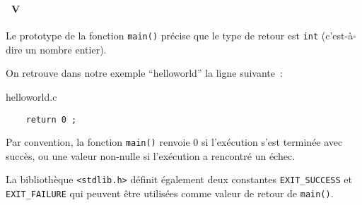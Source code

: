 \begin{frame}[containsverbatim]
  \frametitle{\secname}
  \framesubtitle{\subsecname~V}

  \par
  Le prototype de la fonction \verb|main()| précise que le type de retour est \verb|int| (c'est-à-dire un nombre entier). 
  \par
  On retrouve dans notre exemple ``helloworld'' la ligne suivante~:
  \begin{exampleblock}{helloworld.c}
    \begin{verbatim}
    return 0 ; 
    \end{verbatim}
  \end{exampleblock}
  \par
  Par convention, la fonction \verb|main()| renvoie 0 si l'exécution s'est terminée avec succès, ou une valeur non-nulle si l'exécution a rencontré un échec.
  \par
  La bibliothèque \verb|<stdlib.h>| définit également deux constantes \verb|EXIT_SUCCESS| et \verb|EXIT_FAILURE| qui peuvent être utilisées comme valeur de retour de \verb|main()|.
\end{frame}

